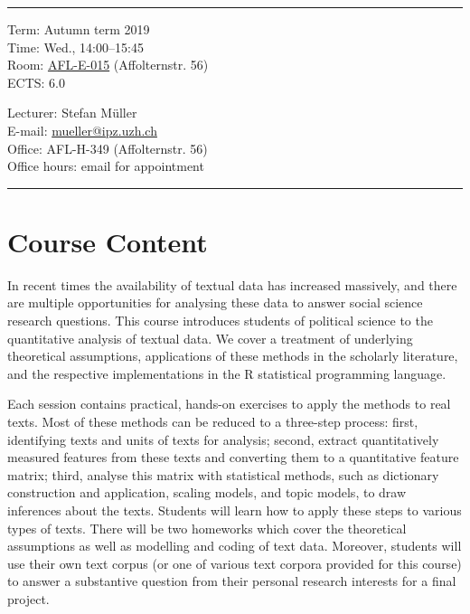 \documentclass[abstract=on,parskip=full,headings=standardclasses,fontsize=11pt,paper=a4]{scrartcl}
\begin{document}
\hrule
\medskip
\begin{minipage}[t]{0.5\textwidth}
Term: Autumn term 2019 \\
Time:  Wed., 14:00--15:45 \\
Room: \href{https://www.plaene.uzh.ch/AFL}{AFL-E-015} (Affolternstr. 56) \\
ECTS: 6.0
\end{minipage}
\begin{minipage}[t]{0.49\textwidth}
\begin{flushright}
Lecturer: Stefan Müller \\
E-mail: \href{mailto:mueller@ipz.uzh.ch}{\textsf{mueller@ipz.uzh.ch}} \\
Office:  AFL-H-349 (Affolternstr. 56) \\
Office hours: email for appointment 
\end{flushright}
\end{minipage}
\medskip
\vspace{2.5mm}
\hrule 

\section*{Course Content}

In recent times the availability of textual data has increased massively, and there are multiple opportunities for analysing these data to answer social science research questions. This course introduces students of political science to the quantitative analysis of textual data. We cover a treatment of underlying theoretical assumptions, applications of these methods in the scholarly literature, and the respective implementations in the \textsf{R} statistical programming language.

Each session  contains practical, hands-on exercises to apply the methods to real texts. Most of these methods can be reduced to a three-step process: first, identifying texts and units of texts for analysis; second, extract quantitatively measured features from these texts and converting them to a quantitative feature matrix; third, analyse this matrix with statistical methods, such as dictionary construction and application, scaling models, and topic models, to draw inferences about the texts. Students will learn how  to apply these steps to various types of texts. There will be two homeworks which cover the theoretical assumptions as well as modelling and coding of text data. Moreover, students will use their own text corpus (or one of various text corpora provided for this course) to answer a substantive question from their personal research interests for a final project.
\end{document}

